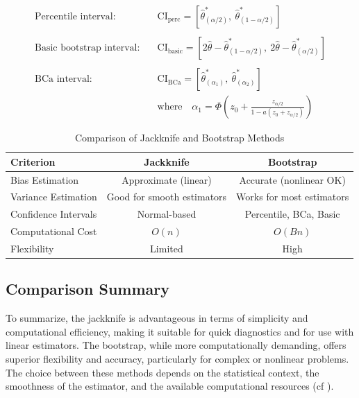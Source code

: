 \documentclass[aodsor,preprint]{imsart}
\numberwithin{equation}{section}
\theoremstyle{plain}
\begin{document}
\begin{align*}
\text{Percentile interval:} \quad & \text{CI}_{\text{perc}} = \left[ \hat{\theta}^{*}_{(\alpha/2)},\ \hat{\theta}^{*}_{(1 - \alpha/2)} \right] \\\\[1ex]
\text{Basic bootstrap interval:} \quad & \text{CI}_{\text{basic}} = \left[ 2\hat{\theta} - \hat{\theta}^{*}_{(1 - \alpha/2)},\ 2\hat{\theta} - \hat{\theta}^{*}_{(\alpha/2)} \right] \\\\[1ex]
\text{BCa interval:} \quad & \text{CI}_{\text{BCa}} = \left[ \hat{\theta}^{*}_{(\alpha_1)},\ \hat{\theta}^{*}_{(\alpha_2)} \right] \\
& \text{where} \quad \alpha_1 = \Phi \left( z_0 + \frac{z_{\alpha/2}}{1 - a(z_0 + z_{\alpha/2})} \right)
\end{align*} 



\begin{table}[h!]
\centering
\caption{Comparison of Jackknife and Bootstrap Methods}
\begin{tabular}{lcc}
\hline
\textbf{Criterion} & \textbf{Jackknife} & \textbf{Bootstrap} \\
\hline
Bias Estimation    & Approximate (linear) & Accurate (nonlinear OK) \\
\hline
Variance Estimation & Good for smooth estimators & Works for most estimators \\
\hline
Confidence Intervals & Normal-based & Percentile, BCa, Basic \\
\hline
Computational Cost & $O(n)$ & $O(Bn)$ \\
\hline
Flexibility        & Limited & High \\
\hline
\end{tabular}
\label{tab:jack_booth}
\end{table}


\subsection{Comparison Summary}

To summarize, the jackknife is advantageous in terms of simplicity and computational efficiency, making it suitable for quick diagnostics and for use with linear estimators. The bootstrap, while more computationally demanding, offers superior flexibility and accuracy, particularly for complex or nonlinear problems. The choice between these methods depends on the statistical context, the smoothness of the estimator, and the available computational resources (cf \cite{efron1982jackknife,efron1993introduction,shao1995jackknife,davison1997bootstrap}).\\
\end{document}
